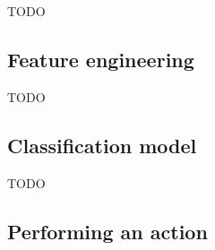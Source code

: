 TODO


\subsection{Feature engineering}
\label{subsec:processing_signals_general_pipeline_features}




TODO


\subsection{Classification model}
\label{subsec:processing_signals_general_pipeline_classification}

TODO


\subsection{Performing an action}
\label{subsec:processing_signals_general_pipeline_perform_action}

